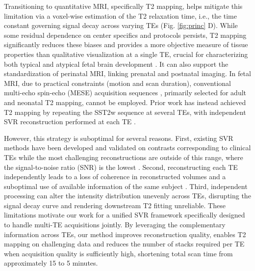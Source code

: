\documentclass[preprint,authoryear,12pt]{elsarticle}
\begin{document}
Transitioning to quantitative MRI, specifically T2 mapping, helps mitigate this limitation via a voxel-wise estimation of the T2 relaxation time, i.e., the time constant governing signal decay across varying TEs \citep{bloch_nuclear_1946} (Fig. \ref{fig:princ} D). While some residual dependence on center specifics and protocols persists, T2 mapping significantly reduces these biases and provides a more objective measure of tissue properties than qualitative visualization at a single TE, crucial for characterizing both typical and atypical fetal brain development \citep{bhattacharya_vivo_2024}.
It can also support the standardization of perinatal MRI, linking prenatal and postnatal imaging. In fetal MRI, due to practical constraints (motion and scan duration), conventional multi-echo spin-echo (MESE) acquisition sequences \citep{whittall_vivo_1997}, primarily selected for adult and neonatal T2 mapping, cannot be employed. Prior work has instead achieved T2 mapping by repeating the SST2w sequence at several TEs, with independent SVR reconstruction performed at each TE \citep{lajous_t2_2020, bhattacharya_vivo_2024, roulet_t2_2025}.


However, this strategy is suboptimal for several reasons. First, existing SVR methods have been developed and validated on contrasts corresponding to clinical TEs while the most challenging reconstructions are outside of this range, where the signal-to-noise ratio (SNR) is the lowest \citep{joshi_optimization_2026}. Second, reconstructing each TE independently leads to a loss of coherence in reconstructed volumes and a suboptimal use of available information of the same subject \citep{bulut_physics-informed_2025}. Third, independent processing can alter the intensity distribution unevenly across TEs, disrupting the signal decay curve and rendering downstream T2 fitting unreliable. These limitations motivate our work for a unified SVR framework specifically designed to handle multi-TE acquisitions jointly. By leveraging the complementary information across TEs, our method improves reconstruction quality, enables T2 mapping on challenging data and reduces the number of stacks required per TE when acquisition quality is sufficiently high, shortening total scan time from approximately 15 to 5 minutes.
\end{document}
